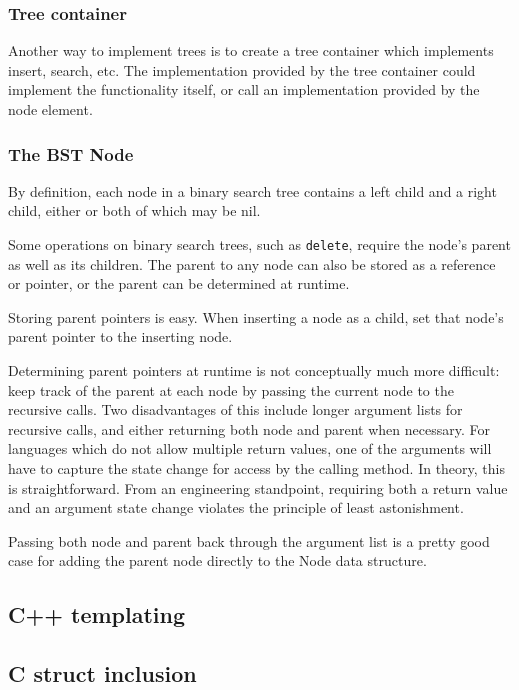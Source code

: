 \documentclass{article}
\begin{document}
\subsubsection{Tree container}

Another way to implement trees is to create a tree container which implements
insert, search, etc. The implementation provided by the tree container could
implement the functionality itself, or call an implementation provided by
the node element.

\subsubsection{The BST Node}

By definition, each node in a binary search tree contains a left child and
a right child, either or both of which may be nil.

Some operations on binary search trees, such as {\tt delete}, require
the node's parent as well as its children. The parent to any node can also
be stored as a reference or pointer, or the parent can be determined at
runtime.

Storing parent pointers is easy. When inserting a node as a child, set that
node's parent pointer to the inserting node.

Determining parent pointers at runtime is not conceptually much more difficult:
keep track of the parent at each node by passing the current node to the
recursive calls. Two disadvantages of this include longer argument lists
for recursive calls, and either returning both node and parent when necessary.
For languages which do not allow multiple return values, one of the arguments
will have to capture the state change for access by the calling method.
In theory, this is straightforward. From an engineering standpoint, requiring
both a return value and an argument state change violates the principle of
least astonishment.

Passing both node and parent back through the argument list is a pretty good
case for adding the parent node directly to the Node data structure.


\subsection{C++ templating}

\subsection{C struct inclusion}
\end{document}
